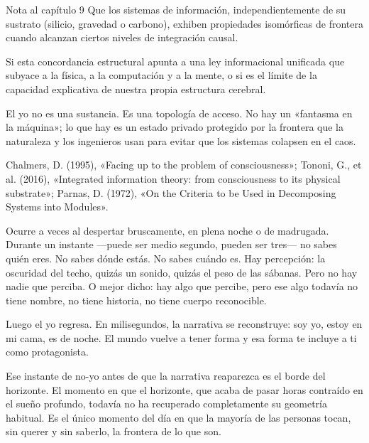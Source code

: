 \begin{notacap}{Nota al capítulo 9}
 Que los sistemas de información, independientemente de su sustrato (silicio, gravedad o carbono), exhiben propiedades isomórficas de frontera cuando alcanzan ciertos niveles de integración causal.

 Si esta concordancia estructural apunta a una ley informacional unificada que subyace a la física, a la computación y a la mente, o si es el límite de la capacidad explicativa de nuestra propia estructura cerebral.

 El yo no es una sustancia. Es una topología de acceso. No hay un «fantasma en la máquina»; lo que hay es un estado privado protegido por la frontera que la naturaleza y los ingenieros usan para evitar que los sistemas colapsen en el caos.

 Chalmers, D. (1995), «Facing up to the problem of consciousness»; Tononi, G., et al. (2016), «Integrated information theory: from consciousness to its physical substrate»; Parnas, D. (1972), «On the Criteria to be Used in Decomposing Systems into Modules».
\end{notacap}
\noindent {}

Ocurre a veces al despertar bruscamente, en plena noche o de madrugada. Durante un instante —puede ser medio segundo, pueden ser tres— no sabes quién eres. No sabes dónde estás. No sabes cuándo es. Hay percepción: la oscuridad del techo, quizás un sonido, quizás el peso de las sábanas. Pero no hay nadie que perciba. O mejor dicho: hay algo que percibe, pero ese algo todavía no tiene nombre, no tiene historia, no tiene cuerpo reconocible.

Luego el yo regresa. En milisegundos, la narrativa se reconstruye: soy yo, estoy en mi cama, es de noche. El mundo vuelve a tener forma y esa forma te incluye a ti como protagonista.

Ese instante de no-yo antes de que la narrativa reaparezca es el borde del horizonte. El momento en que el horizonte, que acaba de pasar horas contraído en el sueño profundo, todavía no ha recuperado completamente su geometría habitual. Es el único momento del día en que la mayoría de las personas tocan, sin querer y sin saberlo, la frontera de lo que son.

